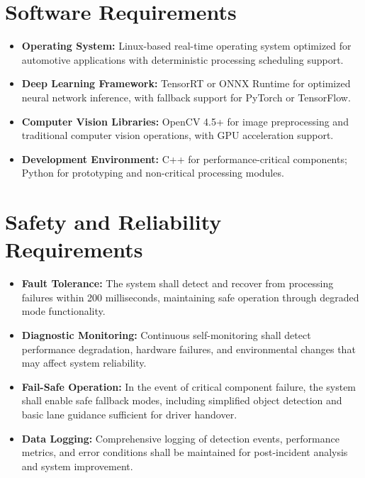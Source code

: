 \section{Software Requirements}

\begin{itemize}
    \item \textbf{Operating System:} Linux-based real-time operating system optimized for automotive applications with deterministic processing scheduling support.
    
    \item \textbf{Deep Learning Framework:} TensorRT or ONNX Runtime for optimized neural network inference, with fallback support for PyTorch or TensorFlow.
    
    \item \textbf{Computer Vision Libraries:} OpenCV 4.5+ for image preprocessing and traditional computer vision operations, with GPU acceleration support.
    
    \item \textbf{Development Environment:} C++ for performance-critical components; Python for prototyping and non-critical processing modules.
\end{itemize}

\section{Safety and Reliability Requirements}

\begin{itemize}
    \item \textbf{Fault Tolerance:} The system shall detect and recover from processing failures within 200 milliseconds, maintaining safe operation through degraded mode functionality.
    
    \item \textbf{Diagnostic Monitoring:} Continuous self-monitoring shall detect performance degradation, hardware failures, and environmental changes that may affect system reliability.
    
    \item \textbf{Fail-Safe Operation:} In the event of critical component failure, the system shall enable safe fallback modes, including simplified object detection and basic lane guidance sufficient for driver handover.
    
    \item \textbf{Data Logging:} Comprehensive logging of detection events, performance metrics, and error conditions shall be maintained for post-incident analysis and system improvement.
\end{itemize}

